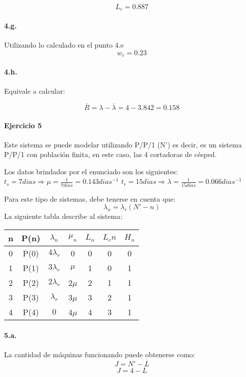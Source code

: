 \documentclass{article}
\begin{document}
    $$ L_c = 0.887$$
    
    \paragraph{4.g.} Utilizando lo calculado en el punto 4.e
    $$ w_c = 0.23 $$
    \paragraph{4.h.} Equivale a calcular:

    $$\overline{R} = \lambda - \overline{\lambda} = 4 - 3.842 = 0.158$$

\paragraph{Ejercicio 5}
  Este sistema se puede modelar utilizando P/P/1 (N') es decir, es un sistema P/P/1 con poblaci\'on finita, en este caso, las 4 cortadoras de c\'esped.
  
  Los datos brindados por el enunciado son los siguientes: $t_s = 7 dias\Rightarrow \mu = \frac{1}{7dias} = 0.143dias^{-1} $  $t_r = 15 dias\Rightarrow\lambda = \frac{1}{15dias} = 0.066dias^{-1}$
  
  Para este tipo de sistemas, debe tenerse en cuenta que:
  $$\lambda_n = \lambda_r (N' - n)$$
    La siguiente tabla describe al sistema:
    \begin{center}
    \begin{tabular}{|| c | c | c | c | c | c | c ||}
    \hline 
     n & P(n) & $\lambda_n$ & $\mu_n$ & $L_n$& $L_cn$ & $H_n$  \\ \hline \hline
     0 & P(0) & $4\lambda_r$   & 0       & 0    & 0      & 0  \\ \hline
     1 & P(1) & $3\lambda_r$   & $\mu$   & 1    & 0      & 1  \\ \hline
     2 & P(2) & $2\lambda_r$   & 2$\mu$  & 2    & 1      & 1    	\\ \hline
     3 & P(3) & $\lambda_r$ & 3$\mu$  & 3    & 2      & 1   \\ \hline
     4 & P(4) & $0$       & 4$\mu$  & 4    & 3      & 1       \\ \hline  
    \end{tabular}
    \end{center}
  
\paragraph{5.a.} La cantidad de m\'aquinas funcionando puede obtenerse como:
  $$J = N' - \overline{L}$$
  $$J = 4 - \overline{L} $$
\end{document}
